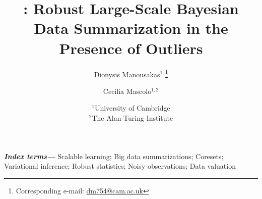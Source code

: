 \documentclass[a4paper,11pt]{article}
\providecommand{\keywords}[1]{\textbf{\textit{Index terms---}} #1}
\begin{document}
\title{\bcores: Robust Large-Scale Bayesian Data Summarization in the Presence of Outliers}
\author{Dionysis Manousakas$^{1,}$\thanks{Corresponding e-mail: \href{mailto:dm754@cam.ac.uk}{dm754@cam.ac.uk}} \and Cecilia Mascolo$^{1,2}$}
\date{%
		$^1$University of Cambridge\\%
		$^2$The Alan Turing Institute\\[2ex]%
}
\maketitle

\keywords{Scalable learning; Big data summarizations; Coresets; Variational inference; Robust statistics; Noisy observations; Data valuation}

%





\appendix
%


\clearpage

\end{document}

